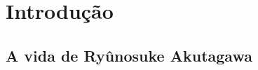 \chapter[Introdução, por Madalena Hashimoto Cordaro]{Introdução}

\section{A vida de Ryûnosuke Akutagawa}



